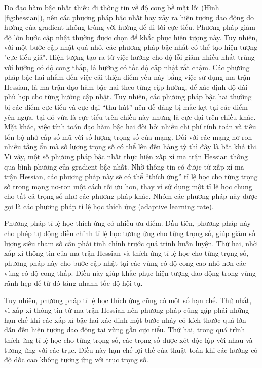 Do đạo hàm bậc nhất thiếu đi thông tin về độ cong bề mặt lỗi (Hình \ref{fig:hessian}), nên các phương pháp bậc nhất hay xảy ra hiện tượng dao động do hướng của gradient không trùng với hướng để đi tới cực tiểu. Phương pháp giảm độ lớn bước cập nhật thường được chọn để khắc phục hiện tượng này. Tuy nhiên, với một bước cập nhật quá nhỏ, các phương pháp bậc nhất có thể tạo hiện tượng "cực tiểu giả". Hiện tượng tạo ra từ việc hướng cho độ lỗi giảm nhiều nhất trùng với hướng có độ cong thấp, là hướng có tốc độ cập nhật rất chậm\cite{martens2010deeplv}. Các phương pháp bậc hai nhắm đến việc cải thiện điểm yếu này bằng việc sử dụng ma trận Hessian, là ma trận đạo hàm bậc hai theo từng cặp hướng, để xác định độ dài phù hợp cho từng hướng cập nhật. Tuy nhiên, các phương pháp bậc hai thường bị các điểm cực tiểu và cực đại ``thu hút'' nên dễ dàng bị mắc kẹt tại các điểm yên ngựa, tại đó vừa là cực tiểu trên chiều này nhưng là cực đại trên chiều khác. Mặt khác, việc tính toán đạo hàm bậc hai đòi hỏi nhiều chi phí tính toán và tiêu tốn bộ nhớ cấp số mũ với số lượng trọng số của mạng. Đối với các mạng nơ-ron nhiều tầng ẩn mà số lượng trọng số có thể lên đến hàng tỷ thì đây là bất khả thi. Vì vậy, một số phương pháp bậc nhất thực hiện xấp xỉ ma trận Hessian thông qua bình phương của gradient bậc nhất. Nhờ thông tin có được từ xấp xỉ ma trận Hessian, các phương pháp này sẽ có thể ``thích ứng'' tỉ lệ học cho từng trọng số trong mạng nơ-ron một cách tối ưu hon, thay vì sử dụng một tỉ lệ học chung cho tất cả trọng số như các phương pháp khác. Nhóm các phương pháp này được gọi là các phương pháp tỉ lệ học thích ứng (adaptive learning rate).

Phương pháp tỉ lệ học thích ứng có nhiều ưu điểm. Đầu tiên, phương pháp này cho phép tự động điều chỉnh tỉ lệ học tương ứng cho từng trọng số, giúp giảm số lượng siêu tham số cần phải tinh chỉnh trước quá trình huấn luyện. Thứ hai, nhờ xấp xỉ thông tin của ma trận Hessian và thích ứng tỉ lệ học cho từng trọng số, phương pháp này cho bước cập nhật tại các vùng có độ cong cao nhỏ hơn các vùng có độ cong thấp. Điều này giúp khắc phục hiện tượng dao động trong vùng rãnh hẹp để từ đó tăng nhanh tốc độ hội tụ.

Tuy nhiên, phương pháp tỉ lệ học thích ứng cũng có một số hạn chế. Thứ nhất, vì xấp xỉ thông tin từ ma trận Hessian nên phương pháp cũng gặp phải những hạn chế khi các xấp xỉ bậc hai xác định một bước nhảy có kích thước quá lớn dẫn đến hiện tượng dao động tại vùng gần cực tiểu. Thứ hai, trong quá trình thích ứng tỉ lệ học cho từng trọng số, các trọng số được xét độc lập với nhau và tương ứng với các trục. Điều này hạn chế lợi thế của thuật toán khi các hướng có độ dốc cao không tương ứng với trục trọng số.

